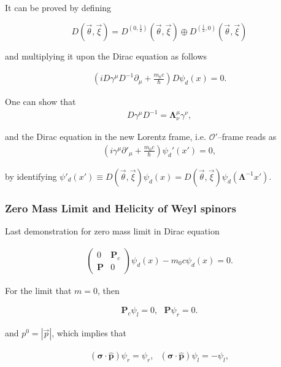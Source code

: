 \documentclass[12pt]{beamer}
\begin{document}
\begin{frame}
It can be proved by defining

$$  
D(\vec{\theta},\vec{\xi})= D^{(0,\frac{1}{2})}(\vec{\theta},\vec{\xi}) \oplus D^{(\frac{1}{2},0)}(\vec{\theta},\vec{\xi}) 
$$

\noindent and multiplying it upon the Dirac equation as follows

\begin{align}
\left(iD\gamma^\mu D^{-1}\partial_\mu+\frac{m_0c}{\hbar}\right)D\psi_d(x)=0.
\end{align}

One can show that\\[-13pt] 

\begin{align}
D\gamma^\mu D^{-1}=\bm{\Lambda}^\mu_\nu\gamma^\nu,
\end{align}

\noindent and the Dirac equation in the new Lorentz frame, i.e.   $ \mathcal{O}' $–frame reads as\\[-13pt]

\begin{align}
\left(i\gamma^\mu\partial'_\mu+\frac{m_0c}{\hbar}\right)\psi_d'(
x')=0,
\end{align}

\noindent by identifying $ \psi'_d(x')\equiv D(\vec{\theta},\vec{\xi})\psi_d(x)=D(\vec{\theta},\vec{\xi})\psi_d(\bm{\Lambda}^{-1}
x') $.
\end{frame}

\begin{frame}
\frametitle{Zero Mass Limit and Helicity of Weyl spinors}

Last demonstration for zero mass limit in Dirac equation

\begin{align}
\begin{pmatrix}0&\bm{P}_c\\\bm{P}&0\end{pmatrix}\psi_d(x)-m_0c\psi_d(x)=0.
\end{align}

For the limit that $ m=0 $, then

\begin{align}
\bm{P}_c\psi_l=0,~~~\bm{P}\psi_r=0.
\end{align}

\noindent and $ p^0=|\vec{p}| $, which implies that

\begin{align}
(\bm{\sigma}\cdot\hat{\bm{p}})\psi_r=\psi_r,~~~
(\bm{\sigma}\cdot\hat{\bm{p}})\psi_l=-\psi_l,
\end{align}

\end{frame}
\end{document}
